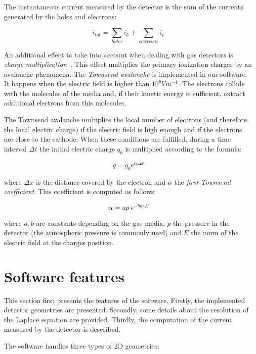 \documentclass[11pt]{article}
\begin{document}
	The instantaneous current measured
	by the detector is the sum of the currents generated by the holes and electrons:

	\begin{equation}
		i_{tot} = \sum_{holes} i_h + \sum_{electrons} i_e
		\label{eq:tot_current}
	\end{equation}

	An additional effect to take into account  when dealing with gas detectors is
	\textit{charge multiplication}~\cite{lphy2236}. This effect
	multiplies the primary ionization charges by an avalanche phenomena.
	The \textit{Townsend avalanche} is implemented in our software. It happens
	when the electric field is higher than $10^6Vm^{-1}$. The electrons collide
	with the molecules of the media and, if their kinetic energy is sufficient,
	extract additional electrons from this molecules.

	The Townsend avalanche multiplies the local number of electrons (and therefore the local electric
	charge) if the electric field is high enough and if the electrons are close
	to the cathode. When these conditions are fulfilled, during a time interval
	$\Delta t$ the initial electric charge $q_0$ is multiplied
	according to the formula:

	\begin{equation}
		q = q_0 e^{\alpha \Delta x}
		\label{eq:townsend}
	\end{equation}

	where $\Delta x$ is the distance covered by the electron and $\alpha$ the
	\textit{first Townsend coefficient}. This coefficient is computed as follows:

	\[\alpha = ap \ e^{-bp/E}\]

	where $a, b$ are constants depending on the gas media, $p$ the pressure in
	the detector (the atmospheric pressure is commonly used) and $E$ the norm
	of the electric field at the charges position.

\section{Software features}

	This section first presents the features of the software. Firstly,
	the implemented detector geometries are presented. Secondly, some details
	about the resolution of the Laplace equation are provided. Thirdly, the
	computation of the current measured by the detector is described.

	The software handles three types of 2D geometries:
\end{document}
